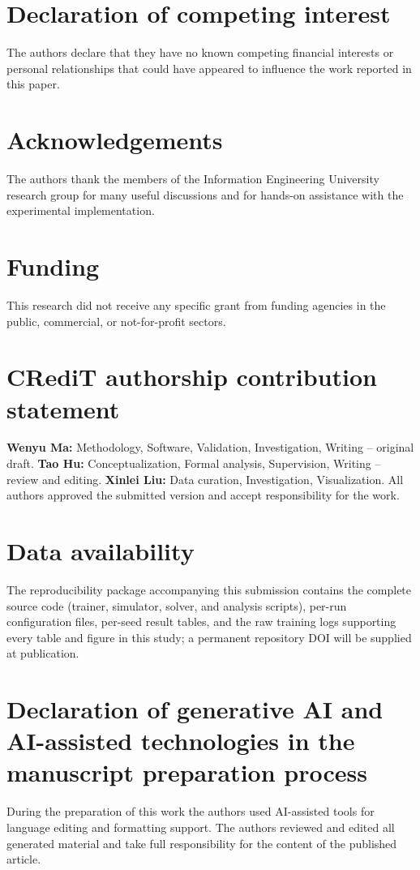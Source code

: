 \documentclass[preprint,12pt]{elsarticle}
\begin{document}
\section*{Declaration of competing interest}
The authors declare that they have no known competing financial interests or personal relationships that could have appeared to influence the work reported in this paper.

\section*{Acknowledgements}
The authors thank the members of the Information Engineering University research group for many useful discussions and for hands-on assistance with the experimental implementation.

\section*{Funding}
This research did not receive any specific grant from funding agencies in the public, commercial, or not-for-profit sectors.

\section*{CRediT authorship contribution statement}
\textbf{Wenyu Ma:} Methodology, Software, Validation, Investigation, Writing -- original draft.
\textbf{Tao Hu:} Conceptualization, Formal analysis, Supervision, Writing -- review and editing.
\textbf{Xinlei Liu:} Data curation, Investigation, Visualization.
All authors approved the submitted version and accept responsibility for the work.

\section*{Data availability}
The reproducibility package accompanying this submission contains the complete source code (trainer, simulator, solver, and analysis scripts), per-run configuration files, per-seed result tables, and the raw training logs supporting every table and figure in this study; a permanent repository DOI will be supplied at publication.

\section*{Declaration of generative AI and AI-assisted technologies in the manuscript preparation process}
During the preparation of this work the authors used AI-assisted tools for language editing and formatting support. The authors reviewed and edited all generated material and take full responsibility for the content of the published article.



\end{document}
